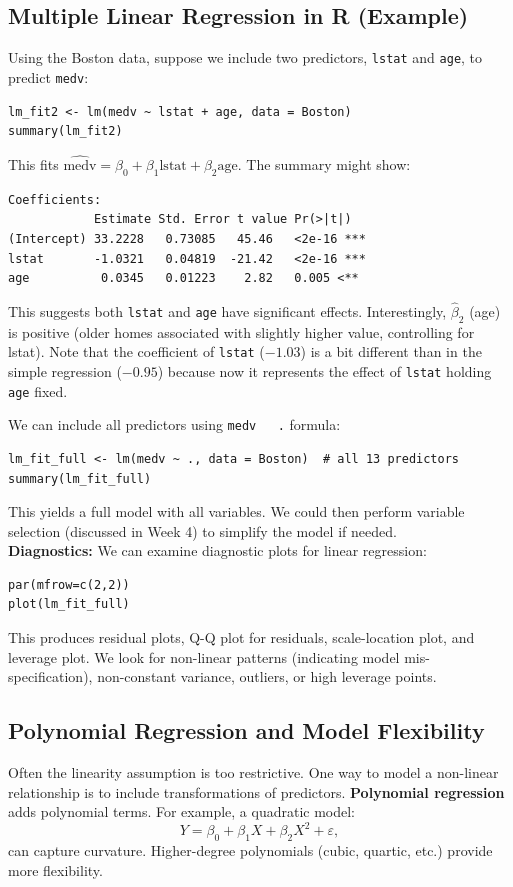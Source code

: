 \documentclass[11pt]{article}
\begin{document}
\subsection{Multiple Linear Regression in R (Example)}
Using the Boston data, suppose we include two predictors, \texttt{lstat} and \texttt{age}, to predict \texttt{medv}:
\begin{verbatim}
lm_fit2 <- lm(medv ~ lstat + age, data = Boston)
summary(lm_fit2)
\end{verbatim}
This fits $\widehat{\text{medv}} = \beta_0 + \beta_1 \text{lstat} + \beta_2 \text{age}$. The summary might show:
\begin{verbatim}
Coefficients:
            Estimate Std. Error t value Pr(>|t|)    
(Intercept) 33.2228   0.73085   45.46   <2e-16 ***
lstat       -1.0321   0.04819  -21.42   <2e-16 ***
age          0.0345   0.01223    2.82   0.005 <**
\end{verbatim}
This suggests both \texttt{lstat} and \texttt{age} have significant effects. Interestingly, $\hat\beta_2$ (age) is positive (older homes associated with slightly higher value, controlling for lstat). Note that the coefficient of \texttt{lstat} ($-1.03$) is a bit different than in the simple regression ($-0.95$) because now it represents the effect of \texttt{lstat} holding \texttt{age} fixed.

We can include all predictors using \texttt{medv ~ .} formula:
\begin{verbatim}
lm_fit_full <- lm(medv ~ ., data = Boston)  # all 13 predictors
summary(lm_fit_full)
\end{verbatim}
This yields a full model with all variables. We could then perform variable selection (discussed in Week 4) to simplify the model if needed. \\

\noindent \textbf{Diagnostics:} We can examine diagnostic plots for linear regression:
\begin{verbatim}
par(mfrow=c(2,2))
plot(lm_fit_full)
\end{verbatim}
This produces residual plots, Q-Q plot for residuals, scale-location plot, and leverage plot. We look for non-linear patterns (indicating model mis-specification), non-constant variance, outliers, or high leverage points. 

\subsection{Polynomial Regression and Model Flexibility}
Often the linearity assumption is too restrictive. One way to model a non-linear relationship is to include transformations of predictors. \textbf{Polynomial regression} adds polynomial terms. For example, a quadratic model:
\[ Y = \beta_0 + \beta_1 X + \beta_2 X^2 + \varepsilon, \] 
can capture curvature. Higher-degree polynomials (cubic, quartic, etc.) provide more flexibility. \\
\end{document}
